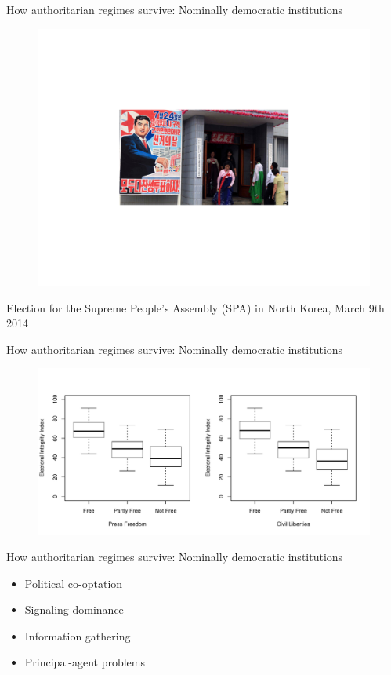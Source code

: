 \documentclass[10pt]{beamer}
\begin{document}
\begin{frame}{How authoritarian regimes survive: Nominally democratic institutions}
	\begin{figure}
	\centering
	\includegraphics[scale=0.6]{Figs/nkorea}
	\end{figure}
	\begin{center}
	Election for the Supreme People's Assembly (SPA) in North Korea, March 9th 2014 
	\end{center}
\end{frame}

\begin{frame}{How authoritarian regimes survive: Nominally democratic institutions}
	\begin{figure}
	\centering
	\includegraphics[scale=0.42]{Figs/pei}
	\end{figure}
\end{frame}

\begin{frame}{How authoritarian regimes survive: Nominally democratic institutions}
	\begin{itemize}
		\item Political co-optation
		\item Signaling dominance
		\item Information gathering
		\item Principal-agent problems
	\end{itemize}
\end{frame}
\end{document}
